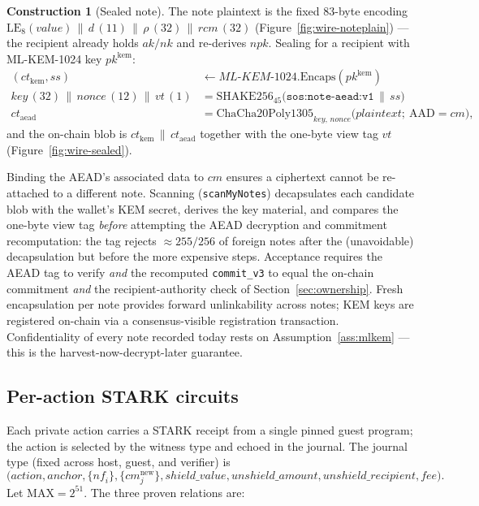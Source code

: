 \documentclass[11pt]{article}
\newcommand{\code}[1]{\texttt{#1}}
\newcommand{\mlkem}{ML\mbox{-}KEM\mbox{-}1024}
\newcommand{\LE}[1]{\mathrm{LE}_{#1}}
\newcommand{\concat}{\,\|\,}
\theoremstyle{plain}
\theoremstyle{definition}
\newtheorem{construction}[theorem]{Construction}
\theoremstyle{remark}
\begin{document}
\begin{construction}[Sealed note]
\label{con:sealed}
The note plaintext is the fixed 83-byte encoding
$\LE{8}(\mathit{value}) \concat d \,(11) \concat \rho \,(32) \concat
\mathit{rcm} \,(32)$ (Figure~\ref{fig:wire-noteplain}) --- the recipient
already holds
$\mathit{ak}/\mathit{nk}$ and re-derives $\mathit{npk}$. Sealing for a
recipient with \mlkem{} key $\mathit{pk}^{\mathrm{kem}}$:
\begin{align*}
(\mathit{ct}_{\mathrm{kem}}, \mathit{ss}) &\gets
   \mlkem{}.\mathrm{Encaps}(\mathit{pk}^{\mathrm{kem}}) \\
\mathit{key}\,(32) \concat \mathit{nonce}\,(12) \concat \mathit{vt}\,(1)
  &= \mathrm{SHAKE256}_{45}\big(\code{sos:note-aead:v1} \concat \mathit{ss}\big) \\
\mathit{ct}_{\mathrm{aead}} &=
   \mathrm{ChaCha20Poly1305}_{\mathit{key},\,\mathit{nonce}}
   \big(\mathit{plaintext};\ \mathrm{AAD} = \mathit{cm}\big),
\end{align*}
and the on-chain blob is $\mathit{ct}_{\mathrm{kem}} \concat
\mathit{ct}_{\mathrm{aead}}$ together with the one-byte view tag
$\mathit{vt}$ (Figure~\ref{fig:wire-sealed}).
\end{construction}

Binding the AEAD's associated data to $\mathit{cm}$ ensures a ciphertext
cannot be re-attached to a different note. Scanning
(\code{scanMyNotes}) decapsulates each candidate blob with the wallet's KEM
secret, derives the key material, and compares the one-byte view tag
\emph{before} attempting the AEAD decryption and commitment recomputation:
the tag rejects $\approx 255/256$ of foreign notes after the (unavoidable)
decapsulation but before the more expensive steps. Acceptance requires the
AEAD tag to verify \emph{and} the recomputed \code{commit\_v3} to equal the
on-chain commitment \emph{and} the recipient-authority check of
Section~\ref{sec:ownership}. Fresh encapsulation per note provides forward
unlinkability across notes; KEM keys are registered on-chain via a
consensus-visible registration transaction. Confidentiality of every note
recorded today rests on Assumption~\ref{ass:mlkem} --- this is the
harvest-now-decrypt-later guarantee.

\subsection{Per-action STARK circuits}
\label{sec:circuits}

Each private action carries a STARK receipt from a single pinned guest
program; the action is selected by the witness type and echoed in the
journal. The journal type (fixed across host, guest, and verifier) is
\[
\big(\mathit{action}, \mathit{anchor}, \{\mathit{nf}_i\},
\{\mathit{cm}^{\mathrm{new}}_j\}, \mathit{shield\_value},
\mathit{unshield\_amount}, \mathit{unshield\_recipient}, \mathit{fee}\big).
\]
Let $\mathrm{MAX} = 2^{51}$. The three proven relations are:
\end{document}
